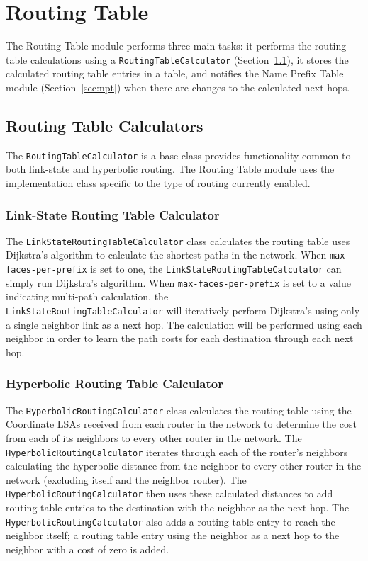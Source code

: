 \section{Routing Table}
\label{sec:routing-table}

The Routing Table module performs three main tasks: it performs the routing table calculations using a \texttt{RoutingTableCalculator} (Section~\ref{sec:routing-table-calculator}),
it stores the calculated routing table entries in a table, and notifies the Name Prefix Table module (Section~\ref{sec:npt}) when there are changes to the calculated next hops.

\subsection{Routing Table Calculators}
\label{sec:routing-table-calculator}

The \texttt{RoutingTableCalculator} is a base class provides functionality common to both link-state and hyperbolic routing.
The Routing Table module uses the implementation class specific to the type of routing currently enabled.

\subsubsection{Link-State Routing Table Calculator}

The \texttt{LinkStateRoutingTableCalculator} class calculates the routing table uses Dijkstra's algorithm to calculate the shortest paths in the network.
When \texttt{max-faces-per-prefix} is set to one, the \texttt{LinkStateRoutingTableCalculator} can simply run Dijkstra's algorithm.
When \texttt{max-faces-per-prefix} is set to a value indicating multi-path calculation, the \\ \texttt{LinkStateRoutingTableCalculator} will iteratively perform Dijkstra's using only a single neighbor link as a next hop.
The calculation will be performed using each neighbor in order to learn the path costs for each destination through each next hop.


\subsubsection{Hyperbolic Routing Table Calculator}

The \texttt{HyperbolicRoutingCalculator} class calculates the routing table using the Coordinate LSAs received from each router in the network to determine the cost from each of its neighbors to every other router in the network.
The \texttt{HyperbolicRoutingCalculator} iterates through each of the router's neighbors calculating the hyperbolic distance from the neighbor to every other router in the network (excluding itself and the neighbor router).
The \texttt{HyperbolicRoutingCalculator} then uses these calculated distances to add routing table entries to the destination with the neighbor as the next hop.
The \texttt{HyperbolicRoutingCalculator} also adds a routing table entry to reach the neighbor itself; a routing table entry using the neighbor as a next hop to the neighbor with a cost of zero is added.

